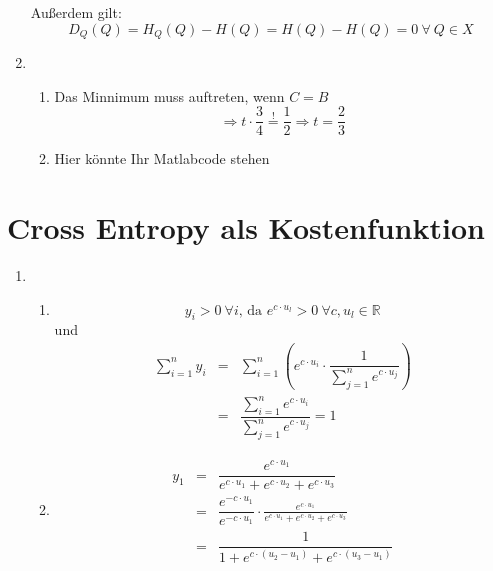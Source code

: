 \documentclass[DIN, pagenumber=false, fontsize=11pt, parskip=half]{scrartcl}
\begin{document}
\begin{enumerate}
			Außerdem gilt:
			\begin{equation*}
					D_Q(Q) = H_Q(Q) - H(Q) = H(Q) - H(Q) = 0 \ \forall \ Q \in X
			\end{equation*}
		\item
			\begin{enumerate}[label=(\alph*)]
				\item Das Minnimum muss auftreten, wenn $C=B$
						\begin{equation*}
								\Rightarrow t \cdot \frac{3}{4} \overset{!}{=} \frac{1}{2} \Rightarrow t = \frac{2}{3}
						\end{equation*}
				\item Hier könnte Ihr Matlabcode stehen
			\end{enumerate}
    \end{enumerate} 
	\section{Cross Entropy als Kostenfunktion}
	\begin{enumerate}
		\item
			\begin{enumerate}[label=(\alph*)]
				\item
					\begin{equation*}
							y_i > 0 \ \forall i \text{, da } e^{c\cdot u_l} > 0 \ \forall c, u_l \in \mathbb{R}
					\end{equation*}
					und 
					\begin{eqnarray*}
							\sum_{i=1}^{n}{y_i} &=& \sum_{i=1}^{n}{\left( e^{c\cdot u_i} \cdot \dfrac{1}{\sum_{j=1}^{n}{e^{c\cdot u_j}}} \right)} \\
							&=& \dfrac{\sum_{i=1}^{n}{e^{c\cdot u_i}}} {\sum_{j=1}^{n}{e^{c\cdot u_j}}} = 1
					\end{eqnarray*}
				\item
					\begin{eqnarray*}
							y_1 &=& \dfrac{e^{c \cdot u_1}}{e^{c \cdot u_1} + e^{c \cdot u_2} + e^{c \cdot u_3}} \\
							&=& \dfrac{e^{-c \cdot u_1}}{e^{-c \cdot u_1}} \cdot \frac{e^{c \cdot u_1}}{e^{c \cdot u_1} + e^{c \cdot u_2} + e^{c \cdot u_3}} \\
							&=& \dfrac{1}{1 + e^{c \cdot (u_2 - u_1)} + e^{c \cdot (u_3 - u_1)}}
					\end{eqnarray*}
			\end{enumerate}
	\end{enumerate}
\end{document}
